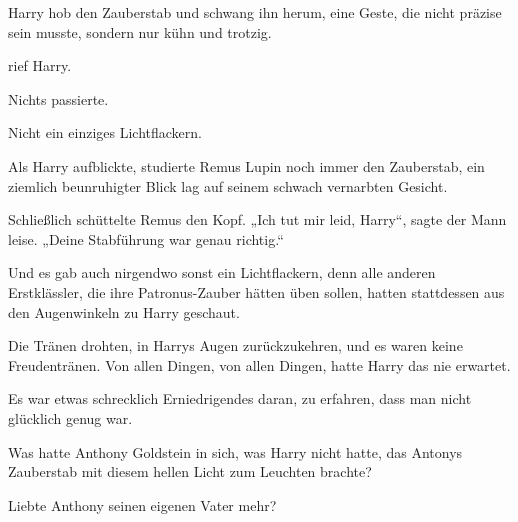 Harry hob den Zauberstab und schwang ihn herum, eine Geste, die nicht präzise sein musste, sondern nur kühn und trotzig.

 rief Harry.

Nichts passierte.

Nicht ein einziges Lichtflackern.

Als Harry aufblickte, studierte Remus Lupin noch immer den Zauberstab, ein ziemlich beunruhigter Blick lag auf seinem schwach vernarbten Gesicht.

Schließlich schüttelte Remus den Kopf.
„Ich tut mir leid, Harry“, sagte der Mann leise.
„Deine Stabführung war genau richtig.“

Und es gab auch nirgendwo sonst ein Lichtflackern, denn alle anderen Erstklässler, die ihre Patronus-Zauber hätten üben sollen, hatten stattdessen aus den Augenwinkeln zu Harry geschaut.

Die Tränen drohten, in Harrys Augen zurückzukehren, und es waren keine Freudentränen. Von allen Dingen, von allen Dingen, hatte Harry das nie erwartet.

Es war etwas schrecklich Erniedrigendes daran, zu erfahren, dass man nicht glücklich genug war.

Was hatte Anthony Goldstein in sich, was Harry nicht hatte, das Antonys Zauberstab mit diesem hellen Licht zum Leuchten brachte?

Liebte Anthony seinen eigenen Vater mehr?

